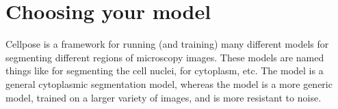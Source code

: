 \documentclass[letterpaper,10pt,english]{jupyterBook}
\begin{document}
\sphinxAtStartPar
{}


\section{Choosing your model}
\label{\detokenize{cellpose:choosing-your-model}}
\sphinxAtStartPar
Cellpose is a framework for running (and training) many different models for segmenting different regions of microscopy images. These models are named things like  for segmenting the cell nuclei,  for cytoplasm, etc. The  model is a general cytoplasmic segmentation model, whereas the  model is a more generic model, trained on a larger variety of images, and is more resistant to noise.
\end{document}
